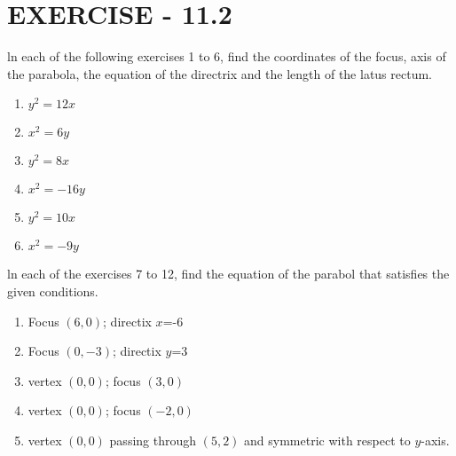 \documentclass[12pt]{article}
\begin{document}
\section*{EXERCISE - 11.2}
ln each of the following exercises 1 to 6, find the coordinates of the focus, axis of the parabola, the equation of the directrix and the  length of the latus rectum.
\begin{enumerate}
\item $y^2=12x$
\item $x^2=6y$
\item $y^2=8x$
\item $x^2=-16y$
\item $y^2=10x$
\item $x^2=-9y$
\end{enumerate}
ln each of the exercises 7 to 12, find the equation of the parabol that satisfies the given conditions.
\begin{enumerate}[resume]
\item Focus $(6,0)$;  directix $x$=-6
\item Focus $(0,-3)$; directix $y$=3
\item vertex $(0,0)$; focus $(3,0)$
\item vertex $(0,0)$; focus $(-2,0)$
\item vertex $(0,0)$ passing through $(5,2)$  and  symmetric with respect to $y$-axis.
\end{enumerate}
\end{document}
